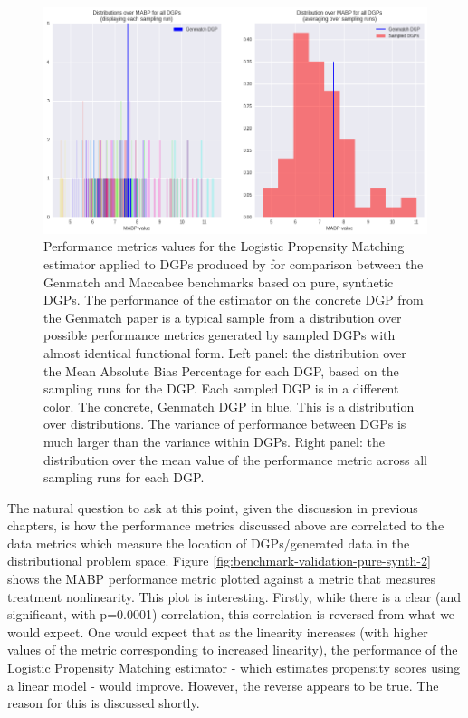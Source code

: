 \documentclass[../main.tex]{subfiles}
\begin{document}
\begin{figure}[ht!]
    \centering
    \includegraphics[width=1\linewidth]{figures/ch7-benchmark-pure-synth-1.png}
    \caption{Performance metrics values for the Logistic Propensity Matching estimator applied to DGPs produced by for comparison between the Genmatch and Maccabee benchmarks based on pure, synthetic DGPs. The performance of the estimator on the concrete DGP from the Genmatch paper is a typical sample from a distribution over possible performance metrics generated by sampled DGPs with almost identical functional form. Left panel: the distribution over the Mean Absolute Bias Percentage for each DGP, based on the sampling runs for the DGP. Each sampled DGP is in a different color. The concrete, Genmatch DGP in blue. This is a distribution over distributions. The variance of performance between DGPs is much larger than the variance within DGPs. Right panel: the distribution over the mean value of the performance metric across all sampling runs for each DGP.}
    \label{fig:benchmark-validation-pure-synth-1}
\end{figure}
\FloatBarrier

The natural question to ask at this point, given the discussion in previous chapters, is how the performance metrics discussed above are correlated to the data metrics which measure the location of DGPs/generated data in the distributional problem space. Figure \ref{fig:benchmark-validation-pure-synth-2} shows the MABP performance metric plotted against a metric that measures treatment nonlinearity. This plot is interesting. Firstly, while there is a clear (and significant, with p=0.0001) correlation, this correlation is reversed from what we would expect. One would expect that as the linearity increases (with higher values of the metric corresponding to increased linearity), the performance of the Logistic Propensity Matching estimator - which estimates propensity scores using a linear model - would improve. However, the reverse appears to be true. The reason for this is discussed shortly.
\vspace{\baselineskip}
\end{document}
